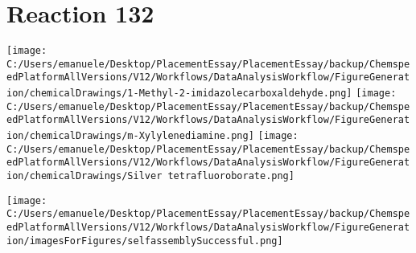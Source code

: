 \documentclass{article}%
\begin{document}
\section*{Reaction 132}%
%
\begin{scheme}[H]%
\begin{minipage}{0.5\textwidth}%
\texttt{[image: C:/Users/emanuele/Desktop/PlacementEssay/PlacementEssay/backup/ChemspeedPlatformAllVersions/V12/Workflows/DataAnalysisWorkflow/FigureGeneration/chemicalDrawings/1-Methyl-2-imidazolecarboxaldehyde.png]}%
\texttt{[image: C:/Users/emanuele/Desktop/PlacementEssay/PlacementEssay/backup/ChemspeedPlatformAllVersions/V12/Workflows/DataAnalysisWorkflow/FigureGeneration/chemicalDrawings/m-Xylylenediamine.png]}%
\texttt{[image: C:/Users/emanuele/Desktop/PlacementEssay/PlacementEssay/backup/ChemspeedPlatformAllVersions/V12/Workflows/DataAnalysisWorkflow/FigureGeneration/chemicalDrawings/Silver tetrafluoroborate.png]}%
\end{minipage}%
\begin{minipage}{0.5\textwidth}%
\begin{center}%
\texttt{[image: C:/Users/emanuele/Desktop/PlacementEssay/PlacementEssay/backup/ChemspeedPlatformAllVersions/V12/Workflows/DataAnalysisWorkflow/FigureGeneration/imagesForFigures/selfassemblySuccessful.png]}%
\end{center}%
\end{minipage}%
\caption{Self-assembly of components 12, 18, with Silver(I) in a 3.0:1.5:1.0 molar ratio in CH$_3$CN at 60\textdegree C for 40h. These are the reagents (starting materials) for reaction 132.}%
\end{scheme}%
\end{document}
